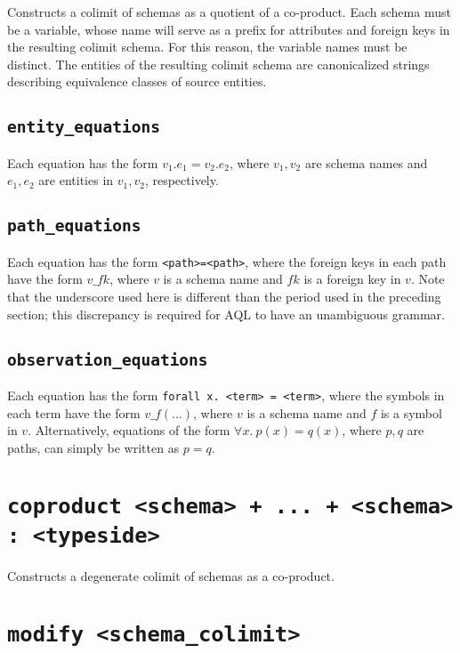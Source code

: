 \documentclass[10pt]{book}
\begin{document}
Constructs a colimit of schemas as a quotient of a co-product.  Each schema must be a variable, whose name will serve as a prefix for attributes and foreign keys in the resulting colimit schema.  For this reason, the variable names must be distinct.  The entities of the resulting colimit schema are canonicalized strings describing equivalence classes of source entities.

\subsection{{\tt entity\_equations}}

Each equation has the form $v_1.e_1 = v_2.e_2$, where $v_1, v_2$ are schema names and $e_1, e_2$ are entities in $v_1, v_2$, respectively.

\subsection{{\tt path\_equations}}

Each equation has the form {\tt <path>=<path>}, where the foreign keys in each path have the form $v\_fk$, where $v$ is a schema name and $fk$ is a foreign key in $v$.  Note that the underscore used here is different than the period used in the preceding section; this discrepancy is required for AQL to have an unambiguous grammar.

\subsection{{\tt observation\_equations}}

Each equation has the form {\tt forall x. <term> = <term>}, where the symbols in each term have the form $v\_f(\ldots)$, where $v$ is a schema name and $f$ is a symbol in $v$.   Alternatively, equations of the form $\forall x. \ p(x) = q(x)$, where $p,q$ are paths, can simply be written as $p = q$.

\section{{\tt coproduct <schema> + ... + <schema> : <typeside>}}

Constructs a degenerate colimit of schemas as a co-product. 

\section{\tt modify <schema\_colimit>}
\end{document}
